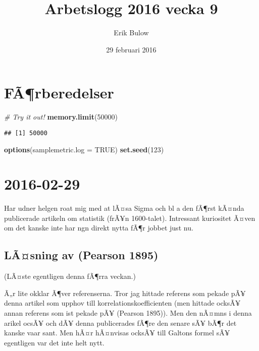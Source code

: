 \documentclass[]{article}
\title{Arbetslogg 2016 vecka 9}
\author{Erik Bulow}
\date{29 februari 2016}
\newenvironment{Shaded}{\begin{snugshade}}{\end{snugshade}}
\newcommand{\KeywordTok}[1]{\textcolor[rgb]{0.13,0.29,0.53}{\textbf{{#1}}}}
\newcommand{\DataTypeTok}[1]{\textcolor[rgb]{0.13,0.29,0.53}{{#1}}}
\newcommand{\DecValTok}[1]{\textcolor[rgb]{0.00,0.00,0.81}{{#1}}}
\newcommand{\CommentTok}[1]{\textcolor[rgb]{0.56,0.35,0.01}{\textit{{#1}}}}
\newcommand{\OtherTok}[1]{\textcolor[rgb]{0.56,0.35,0.01}{{#1}}}
\newcommand{\NormalTok}[1]{{#1}}
\begin{document}
\maketitle

{
\hypersetup{linkcolor=black}
\setcounter{tocdepth}{2}
\tableofcontents
}
\section{FÃ¶rberedelser}\label{farberedelser}

\begin{Shaded}
\begin{Highlighting}[]
\CommentTok{# Try it out!}
\KeywordTok{memory.limit}\NormalTok{(}\DecValTok{50000}\NormalTok{)}
\end{Highlighting}
\end{Shaded}

\begin{verbatim}
## [1] 50000
\end{verbatim}

\begin{Shaded}
\begin{Highlighting}[]
\KeywordTok{options}\NormalTok{(}\DataTypeTok{samplemetric.log =} \OtherTok{TRUE}\NormalTok{)}
\KeywordTok{set.seed}\NormalTok{(}\DecValTok{123}\NormalTok{)}
\end{Highlighting}
\end{Shaded}

\section{2016-02-29}\label{section}

Har udner helgen roat mig med at lÃ¤sa Sigma och bl a den fÃ¶rst kÃ¤nda
publicerade artikeln om statistik (frÃ¥n 1600-talet). Intressant
kuriositet Ã¤ven om det kanske inte har ngn direkt nytta fÃ¶r jobbet
just nu.

\subsection{LÃ¤sning av (Pearson 1895)}\label{lasning-av-pearson1895}

(LÃ¤ste egentligen denna fÃ¶rra veckan.)

Ã„r lite okklar Ã¶ver referenserna. Tror jag hittade referens som pekade
pÃ¥ denna artikel som upphov till korrelationskoefficienten (men hittade
ocksÃ¥ annan referens som ist pekade pÃ¥ (Pearson 1895)). Men den nÃ¤mns
i denna arikel ocsÃ¥ och dÃ¥ denna publicerades fÃ¶re den senare sÃ¥
bÃ¶r det kanske vaar sant. Men hÃ¤r hÃ¤nvisas ocksÃ¥ till Galtons formel
sÃ¥ egentligen var det inte helt nytt.
\end{document}
